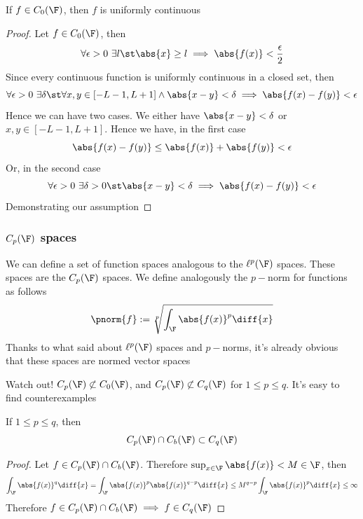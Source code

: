 \documentclass[../mmf.tex]{subfiles}
\begin{document}
\begin{prop}
	If $f\in C_0(\F)$, then $f$ is uniformly continuous
\end{prop}
\begin{proof}
	Let $f\in C_0(\F)$, then
	\begin{equation*}
		\forall\epsilon>0\ \exists l\st \abs{x}\ge l\implies{}\abs{f(x)}<\frac{\epsilon}{2}
	\end{equation*}
	Since every continuous function is uniformly continuous in a closed set, then
	\begin{equation*}
		\forall\epsilon>0\ \exists\delta\st\forall x,y\in[-L-1,L+1]\wedge\abs{x-y}<\delta\implies{}\abs{f(x)-f(y)}<\epsilon
	\end{equation*}
	Hence we can have two cases. We either have $\abs{x-y}<\delta$ or $x,y\in[-L-1,L+1]$. Hence we have, in the first case
	\begin{equation*}
		\abs{f(x)-f(y)}\le\abs{f(x)}+\abs{f(y)}<\epsilon
	\end{equation*}
	Or, in the second case
	\begin{equation*}
		\forall\epsilon>0\ \exists\delta>0\st\abs{x-y}<\delta\implies{}\abs{f(x)-f(y)}<\epsilon
	\end{equation*}
	Demonstrating our assumption
\end{proof}
\subsubsection{$C_p(\F)$ spaces}
\begin{dfn}
	We can define a set of function spaces analogous to the $\ell^p(\F)$ spaces. These spaces are the $C_p(\F)$ spaces. We define analogously the $p-$norm for functions as follows
	\begin{equation}
		\pnorm{f}:=\sqrt[p]{\int_{\F}\abs{f(x)}^p\diff{x}}
		\label{eq:funpnorm}
	\end{equation}
	Thanks to what said about $\ell^p(\F)$ spaces and $p-$norms, it's already obvious that these spaces are normed vector spaces
\end{dfn}
\begin{rmk}
	Watch out! $C_p(\F)\not\subset C_0(\F)$, and $C_p(\F)\not\subset C_q(\F)$ for $1\le p\le q$. It's easy to find counterexamples
\end{rmk}
\begin{prop}
	If $1\le p\le q$, then
	\begin{equation*}
		C_p(\F)\cap C_b(\F)\subset C_q(\F)
	\end{equation*}
\end{prop}
\begin{proof}
	Let $f\in C_p(\F)\cap C_b(\F)$. Therefore $\sup_{x\in\F}\abs{f(x)}<M\in\F$, then
	\begin{equation*}
		\int_{\F}\abs{f(x)}^q\diff{x}=\int_{\F}^{}\abs{f(x)}^p\abs{f(x)}^{q-p}\diff{x}\le M^{q-p}\int_{\F}\abs{f(x)}^p\diff{x}\le\infty
	\end{equation*}
	Therefore $f\in C_p(\F)\cap C_b(\F)\implies{} f\in C_q(\F)$
\end{proof}
\end{document}
